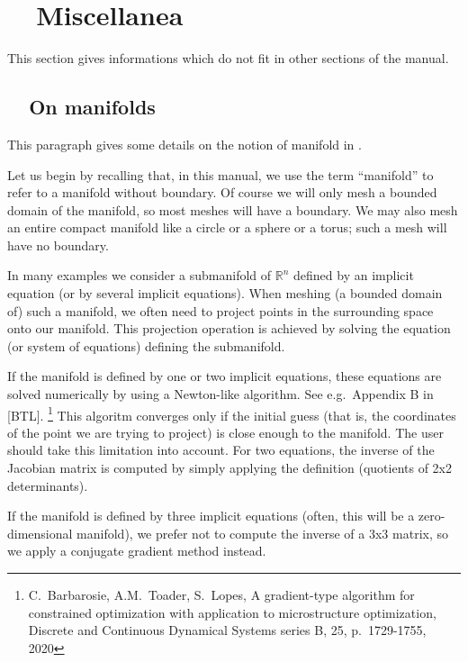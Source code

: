 
\chapter{~~Miscellanea}\label{\numb section 8}

This section gives informations which do not fit in other sections of the manual.


\section{~~On manifolds}\label{\numb section 8.\numb parag 1}

This paragraph gives some details on the notion of manifold in \maniFEM.

Let us begin by recalling that, in this manual, we use the term ``manifold'' to refer to
a manifold without boundary.
Of course we will only mesh a bounded domain of the manifold, so most meshes will have a boundary.
We may also mesh an entire compact manifold like a circle or a sphere or a torus;
such a mesh will have no boundary.

In many examples we consider a submanifold of $ \mathbb{R}^n $ defined by an implicit equation
(or by several implicit equations).
When meshing (a bounded domain of) such a manifold, we often need to project points in
the surrounding space onto our manifold.
This projection operation is achieved by solving
the equation (or system of equations) defining the submanifold.

If the manifold is defined by one or two implicit equations,
these equations are solved numerically by using a Newton-like algorithm.
See e.g.\ Appendix B in [BTL].%
\footnote {{} C.~Barbarosie, A.M.~Toader, S.~Lopes, A gradient-type algorithm for constrained
optimization with application to microstructure optimization, Discrete and Continuous Dynamical
Systems series B, 25, p.\ 1729-1755, 2020}
This algoritm converges only if the initial guess (that is, the coordinates of the point we are
trying to project) is close enough to the manifold.
The user should take this limitation into account.
For two equations, the inverse of the Jacobian matrix is computed by simply applying the definition
(quotients of 2x2 determinants).

If the manifold is defined by three implicit equations (often, this will be a zero-dimensional manifold),
we prefer not to compute the inverse of a 3x3 matrix, so we apply a conjugate gradient method instead.

